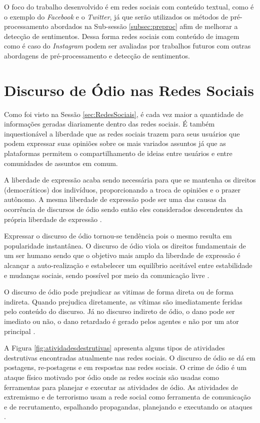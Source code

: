 O foco do trabalho desenvolvido é em redes sociais com conteúdo textual, como é o exemplo do \textit{Facebook} e o \textit{Twitter}, já que serão utilizados os métodos de pré-processamento abordados na Sub-sessão \ref{subsec:preproc} afim de melhorar a detecção de sentimentos. Dessa forma redes sociais com conteúdo de imagem como é caso do \textit{Instagram} podem ser avaliadas por trabalhos futuros com outras abordagens de pré-processamento e detecção de sentimentos.

\section{Discurso de Ódio nas Redes Sociais}
Como foi visto na Sessão \ref{sec:RedesSociais}, é cada vez maior a quantidade de informações geradas diariamente dentro das redes sociais. É também inquestionável a liberdade que as redes sociais trazem para seus usuários que podem expressar suas opiniões sobre os mais variados assuntos já que as plataformas permitem o compartilhamento de ideias entre usuários e entre comunidades de assuntos em comum. 

A liberdade de expressão acaba sendo necessária para que se mantenha os direitos (democráticos) dos indivíduos, proporcionando a troca de opiniões e o prazer autônomo. A mesma liberdade de expressão pode ser uma das causas da ocorrência de discursos de ódio sendo então eles  considerados descendentes da própria liberdade de expressão \cite{Chetty2018}.

Expressar o discurso de ódio tornou-se tendência pois o mesmo resulta em popularidade instantânea. O discurso de ódio viola os direitos fundamentais de um ser humano sendo que o objetivo mais amplo da liberdade de expressão é alcançar a auto-realização e estabelecer um equilíbrio aceitável entre estabilidade e mudanças sociais, sendo possível por meio da comunicação livre \cite{Chetty2018}.

O discurso de ódio pode prejudicar as vitimas de forma direta ou de forma indireta. Quando prejudica diretamente, as vítimas são imediatamente feridas pelo conteúdo do discurso. Já no discurso indireto de ódio, o dano pode ser imediato ou não, o dano retardado é gerado pelos agentes e não por um ator principal \cite{Seglow2016}. 

A Figura \ref{fig:atividadesdestrutivas} apresenta alguns tipos de atividades destrutivas encontradas atualmente nas redes sociais. O discurso de ódio se dá em postagens, re-postagens e em respostas nas redes sociais. O crime de ódio é um ataque físico motivado por ódio onde as redes sociais são usadas como ferramentas para planejar e executar as atividades de ódio. As atividades de extremismo e de terrorismo usam a rede social como ferramenta de comunicação e de recrutamento, espalhando propagandas, planejando e executando os ataques  \cite{Chetty2018}.

